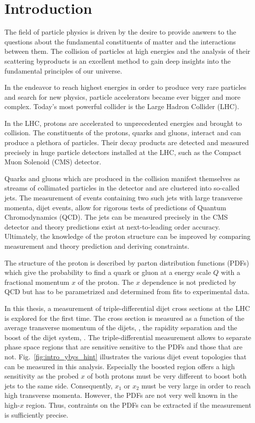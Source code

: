 
\chapter{Introduction}

The field of particle physics is driven by the desire to provide answers to the
questions about the fundamental constituents of matter and the interactions
between them. The collision of particles at high energies and the analysis of
their scattering byproducts is an excellent method to gain deep insights into
the fundamental principles of our universe.

In the endeavor to reach highest energies in order to produce very rare particles and
search for new physics, particle accelerators became ever bigger and more
complex. Today's most powerful collider is the Large Hadron Collider (LHC).

In the LHC, protons are accelerated to unprecedented energies and brought to
collision. The constituents of the protons, quarks and gluons, interact and can
produce a plethora of particles. Their decay products are detected and
measured precisely in huge particle detectors installed at the LHC, such as the
Compact Muon Solenoid (CMS) detector.

Quarks and gluons which are produced in the collision manifest themselves as
streams of collimated particles in the detector and are clustered into so-called
jets. The measurement of events containing two such jets with large
transverse momenta, dijet events, allow for rigorous tests of predictions of
Quantum Chromodynamics (QCD). The jets can be measured precisely in the CMS
detector and theory predictions exist at next-to-leading order accuracy.
Ultimately, the knowledge of the proton structure can be improved by comparing
measurement and theory prediction and deriving constraints.

The structure of the proton is described by parton distribution functions (PDFs) which
give the probability to find a quark or gluon at a energy scale $Q$ with a fractional
momentum $x$ of the proton. The $x$ dependence is not predicted by QCD but has
to be parametrized and determined from fits to experimental data.

In this thesis, a measurement of triple-differential dijet cross sections at the
LHC is explored for the first time. The cross section is measured as a function
of the average transverse momentum of the dijets, \ptavg, the rapidity
separation \ystar and the boost of the dijet system, \yboost. The
triple-differential measurement allows to separate phase space regions that are
sensitive sensitive to the PDFs and those that are not.
Fig.~\ref{fig:intro_ybys_hint} illustrates the various dijet event topologies
that can be measured in this analysis. Especially the boosted region offers a
high sensitivity as the probed $x$ of both protons must be very different to
boost both jets to the same side. Consequently, $x_1$ or $x_2$ must be very
large in order to reach high transverse momenta. However, the PDFs are not very
well known in the high-$x$ region. Thus, contraints on the PDFs can be extracted
if the measurement is sufficiently precise.

